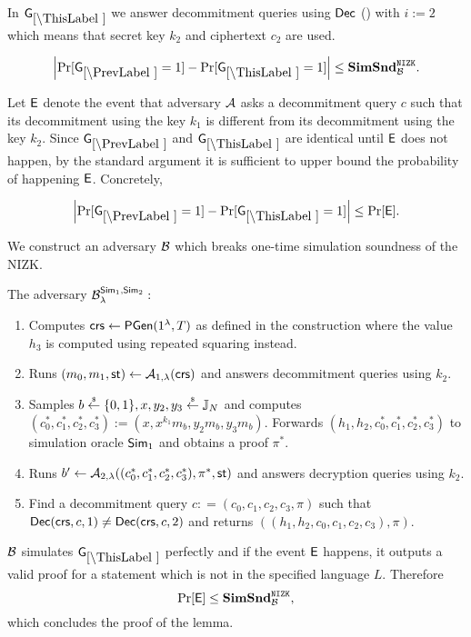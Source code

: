 
In $\games_\thisgame$ we answer decommitment queries using $\mathsf{Dec}$ () with $i:=2$ which means that secret key $k_2$ and ciphertext $c_2$ are used. 

\begin{lemma}
\[
\left|\Pr[\games_\prevgame = 1] - \Pr[\games_\thisgame = 1]\right| \leq \simsnd^\nizk_\advB. 
\]
\end{lemma}

Let $\mathsf{E}$ denote the event that adversary $\mathcal{A}$ asks a decommitment query $c$ such that its decommitment using the key $k_1$ is different from its decommitment using the key $k_2$. Since $\games_\prevgame$ and $\games_\thisgame$ are identical until $\mathsf{E}$ does not happen, by the standard argument it is sufficient to upper bound the probability of happening $\mathsf{E}$. Concretely,  

\[
\left|\Pr[\games_\prevgame = 1] - \Pr[\games_\thisgame = 1]\right| \leq \Pr[\event]. 
\]

We construct an adversary $\mathcal{B}$ which breaks one-time simulation soundness of the NIZK. 

The adversary $\mathcal{B}_{\lambda}^{\mathsf{Sim}_1, \mathsf{Sim}_2}:$
\vspace{-2mm}
\begin{enumerate}
\item Computes $\mathsf{crs} \leftarrow \mathsf{PGen}(1{^{\lambda}}, T)$ as defined in the construction where the value $h_3$ is computed using repeated squaring instead.
\item Runs $(m_0, m_1, \mathsf{st}) \leftarrow \mathcal{A}_{1, \lambda}(\mathsf{crs})$ and answers decommitment queries using $k_2$.
\item Samples $b \stackrel{{\scriptscriptstyle\$}}{\leftarrow} \{0,1\}, x, y_2, y_3 \stackrel{{\scriptscriptstyle\$}}{\leftarrow} \mathbb{J}_N$ and computes $(c_0^*, c_1^*, c_2^*, c_3^*):=(x, x^{k_1} m_b,\allowbreak y_2 m_b, y_3 m_b)$. Forwards $(h_1, h_2, c_0^*, c_1^*, c_2^*, c_3^*)$ to simulation oracle $\mathsf{Sim}_1$ and obtains a proof $\pi^*$.
\item Runs $b' \leftarrow \mathcal{A}_{2, \lambda}((c_0^*, c_1^*, c_2^*, c_3^*), \pi^*, \mathsf{st})$ and answers decryption queries using $k_2$.
\item Find a decommitment query $c: = (c_0, c_1, c_2, c_3, \pi)$ such that $\mathsf{Dec}(\mathsf{crs}, c, 1) \neq \mathsf{Dec}(\mathsf{crs},c,2)$ and returns $((h_1, h_2, c_0, c_1, c_2, c_3), \pi)$.
\end{enumerate}

$\mathcal{B}$ simulates $\games_\thisgame$ perfectly and if the event $\mathsf{E}$ happens, it outputs a valid proof for a statement which is not in the specified language $L$. Therefore
\[\Pr[\mathsf{E}] \leq \mathbf{SimSnd}^{\mathtt{NIZK}}_{\mathcal{B}},\]
which concludes the proof of the lemma.  

